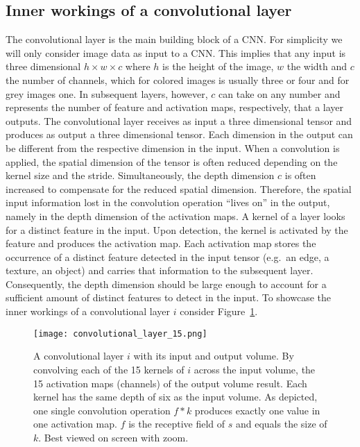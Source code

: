 \documentclass[a4paper,12pt]{report}
\begin{document}
\subsection{Inner workings of a convolutional layer}\label{subsec:innerworkconvl}
The convolutional layer is the main building block of a CNN. For simplicity we will only consider image data as input to a CNN. This implies that any input is three dimensional $h \times w \times c$ where $h$ is the height of the image, $w$ the width and $c$ the number of channels, which for colored images is usually three or four and for grey images one. In subsequent layers, however, $c$ can take on any number and represents the number of feature and activation maps, respectively, that a layer outputs. The convolutional layer receives as input a three dimensional tensor and produces as output a three dimensional tensor. Each dimension in the output can be different from the respective dimension in the input. When a convolution is applied, the spatial dimension of the tensor is often reduced depending on the kernel size and the stride. Simultaneously, the depth dimension $c$ is often increased to compensate for the reduced spatial dimension. Therefore, the spatial input information lost in the convolution operation ``lives on'' in the output, namely in the depth dimension of the activation maps. A kernel of a layer looks for a distinct feature in the input. Upon detection, the kernel is activated by the feature and produces the activation map. Each activation map stores the occurrence of a distinct feature detected in the input tensor (e.g.\ an edge, a texture, an object) and carries that information to the subsequent layer. Consequently, the depth dimension should be large enough to account for a sufficient amount of distinct features to detect in the input. To showcase the inner workings of a convolutional layer $i$ consider Figure~\ref{fig:conv_layer}. 
\begin{figure}[ht]
\centering
\texttt{[image: convolutional\_layer\_15.png]}
\caption[Inner workings of a convolutional layer.]{A convolutional layer $i$ with its input and output volume. By convolving each of the 15 kernels of $i$ across the input volume, the 15 activation maps (channels) of the output volume result. Each kernel has the same depth of six as the input volume. As depicted, one single convolution operation $f * k$ produces exactly one value in one activation map. $f$ is the receptive field of $s$ and equals the size of $k$. Best viewed on screen with zoom.}
\label{fig:conv_layer}
\end{figure}
\end{document}
